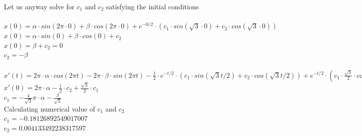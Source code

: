 \documentclass{article}
\begin{document}
\begin{enumerate}
    Let us anyway solve for $c_1$ and $c_2$ satisfying the initial conditions\\\\
    $x(0) = \alpha \cdot sin(2\pi \cdot 0) + \beta \cdot cos(2\pi \cdot 0) + e^{-0/2} \cdot (c_1 \cdot sin(\sqrt{3} \cdot 0) + c_2 \cdot cos(\sqrt{3} \cdot 0))$\\
    $x(0) = \alpha \cdot sin(0) + \beta \cdot cos(0) + c_2$\\
    $x(0) = \beta + c_2 = 0$\\
    $c_2 = -\beta$\\\\
    $x'(t) = 2\pi \cdot \alpha \cdot cos(2\pi t) - 2\pi \cdot \beta \cdot sin(2\pi t) - \frac{1}{2} \cdot e^{-t/2} \cdot (c_1 \cdot sin(\sqrt{3}t/2) + c_2 \cdot cos(\sqrt{3}t/2)) + e^{-t/2} \cdot (c_1 \cdot \frac{\sqrt{3}}{2} \cdot cos(\sqrt{3}t/2) - c_2 \cdot \frac{\sqrt{3}}{2} \cdot sin(\sqrt{3}t/2))$\\
    $x'(0) = 2\pi \cdot \alpha - \frac{1}{2} \cdot c_2 + \frac{\sqrt{3}}{2} \cdot c_1$\\
    $c_1 = -\frac{4}{\sqrt{3}}\pi \cdot \alpha - \frac{\beta}{\sqrt{3}}$\\
    Calculating numerical value of $c_1$ and $c_2$\\
    $c_1 = -0.18126892549017007$\\
    $c_2 = 0.004133492238317597$\\
\end{enumerate}
\end{document}

